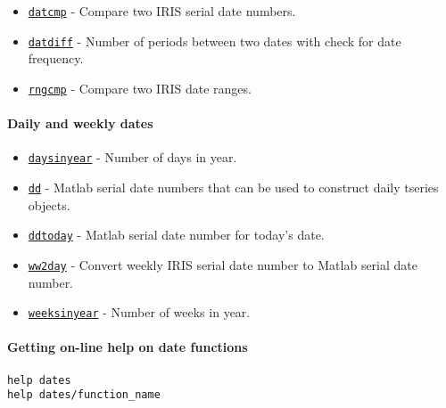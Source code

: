 \begin{itemize}
\itemsep1pt\parskip0pt
\item
  \href{dates/datcmp}{\texttt{datcmp}} - Compare two IRIS serial date
  numbers.
\item
  \href{dates/datdiff}{\texttt{datdiff}} - Number of periods between two
  dates with check for date frequency.
\item
  \href{dates/rngcmp}{\texttt{rngcmp}} - Compare two IRIS date ranges.
\end{itemize}

\paragraph{Daily and weekly dates}

\begin{itemize}
\itemsep1pt\parskip0pt
\item
  \href{dates/daysinyear}{\texttt{daysinyear}} - Number of days in year.
\item
  \href{dates/dd}{\texttt{dd}} - Matlab serial date numbers that can be
  used to construct daily tseries objects.
\item
  \href{dates/ddtoday}{\texttt{ddtoday}} - Matlab serial date number for
  today's date.
\item
  \href{dates/ww2day}{\texttt{ww2day}} - Convert weekly IRIS serial date
  number to Matlab serial date number.
\item
  \href{dates/weeksinyear}{\texttt{weeksinyear}} - Number of weeks in
  year.
\end{itemize}

\paragraph{Getting on-line help on date
functions}

\begin{verbatim}
help dates
help dates/function_name
\end{verbatim}



